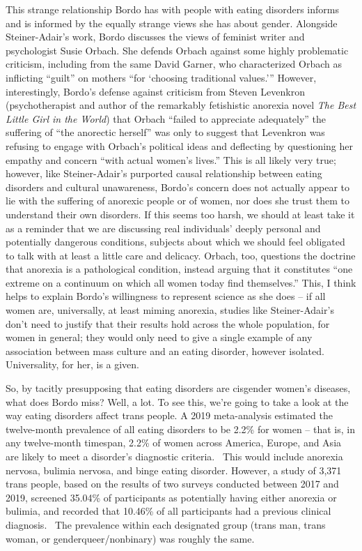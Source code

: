 \documentclass[11pt]{article}
\begin{document}
    This strange relationship Bordo has with people with eating disorders informs and is informed by the equally strange views she has about gender. Alongside Steiner-Adair's work, Bordo discusses the views of feminist writer and psychologist Susie Orbach. She defends Orbach against some highly problematic criticism, including from the same David Garner, who characterized Orbach as inflicting ``guilt'' on mothers ``for `choosing traditional values.''' However, interestingly, Bordo's defense against criticism from Steven Levenkron (psychotherapist and author of the remarkably fetishistic anorexia novel \textit{The Best Little Girl in the World}) that Orbach ``failed to appreciate adequately'' the suffering of ``the anorectic herself'' was only to suggest that Levenkron was refusing to engage with Orbach's political ideas and deflecting by questioning her empathy and concern ``with actual women's lives.'' This is all likely very true; however, like Steiner-Adair's purported causal relationship between eating disorders and cultural unawareness, Bordo's concern does not actually appear to lie with the suffering of anorexic people or of women, nor does she trust them to understand their own disorders. If this seems too harsh, we should at least take it as a reminder that we are discussing real individuals' deeply personal and potentially dangerous conditions, subjects about which we should feel obligated to talk with at least a little care and delicacy. Orbach, too, questions the doctrine that anorexia is a pathological condition, instead arguing that it constitutes ``one extreme on a continuum on which all women today find themselves.'' This, I think helps to explain Bordo's willingness to represent science as she does -- if all women are, universally, at least miming anorexia, studies like Steiner-Adair's don't need to justify that their results hold across the whole population, for women in general; they would only need to give a single example of any association between mass culture and an eating disorder, however isolated. Universality, for her, is a given.~\autocite[47]{Bordo03}

    So, by tacitly presupposing that eating disorders are cisgender women's diseases, what does Bordo miss? Well, a lot. To see this, we're going to take a look at the way eating disorders affect trans people. A 2019 meta-analysis estimated the twelve-month prevalence of all eating disorders to be 2.2\% for women -- that is, in any twelve-month timespan, 2.2\% of women across America, Europe, and Asia are likely to meet a disorder's diagnostic criteria.~\autocite[1406]{Galmiche19} This would include anorexia nervosa, bulimia nervosa, and binge eating disorder. However, a study of 3,371 trans people, based on the results of two surveys conducted between 2017 and 2019, screened 35.04\% of participants as potentially having either anorexia or bulimia, and recorded that 10.46\% of all participants had a previous clinical diagnosis.~\autocite[449]{Romano21} The prevalence within each designated group (trans man, trans woman, or genderqueer/nonbinary) was roughly the same.
\end{document}
